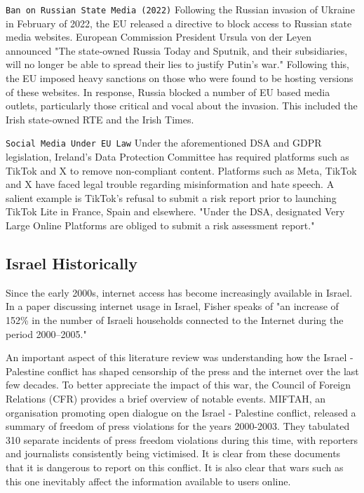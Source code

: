 \texttt{Ban on Russian State Media (2022)}
Following the Russian invasion of Ukraine in February of 2022, the EU released a directive \cite{eu_sanctions_russia_media} to block access to Russian state media websites. European Commission President Ursula von der Leyen announced "The state-owned Russia Today and Sputnik, and their subsidiaries, will no longer be able to spread their lies to justify Putin’s war." \cite{rt_ban2022} Following this, the EU imposed heavy sanctions on those who were found to be hosting versions of these websites. In response, Russia blocked a number of EU based media outlets, particularly those critical and vocal about the invasion. This included the Irish state-owned RTE and the Irish Times. \cite{euronews_russia_media_block2024}

\texttt{Social Media Under EU Law}
Under the aforementioned DSA and GDPR legislation, Ireland's Data Protection Committee has required platforms such as TikTok and X to remove non-compliant content. Platforms such as Meta, TikTok and X have faced legal trouble regarding misinformation and hate speech. A salient example is TikTok's refusal to submit a risk report prior to launching TikTok Lite in France, Spain and elsewhere. "Under the DSA, designated Very Large Online Platforms are obliged to submit a risk assessment report." \cite{ec_press_release_2024} 


\subsection{Israel Historically}
Since the early 2000s, internet access has become increasingly available in Israel. In a paper discussing internet usage in Israel, Fisher speaks of "an increase of 152\% in the number of Israeli households connected to the Internet during the period 2000–2005." \cite{FISHER2006984} 

An important aspect of this literature review was understanding how the Israel - Palestine conflict has shaped censorship of the press and the internet over the last few decades. To better appreciate the impact of this war, the Council of Foreign Relations (CFR) provides a brief overview of notable events. \cite{CFR2024Timeline} MIFTAH, an organisation promoting open dialogue on the Israel - Palestine conflict, released a summary of freedom of press violations for the years 2000-2003. They tabulated 310 separate incidents of press freedom violations during this time, with reporters and journalists consistently being victimised. \cite{Miftah2003Censorship} It is clear from these documents that it is dangerous to report on this conflict. It is also clear that wars such as this one inevitably affect the information available to users online.

